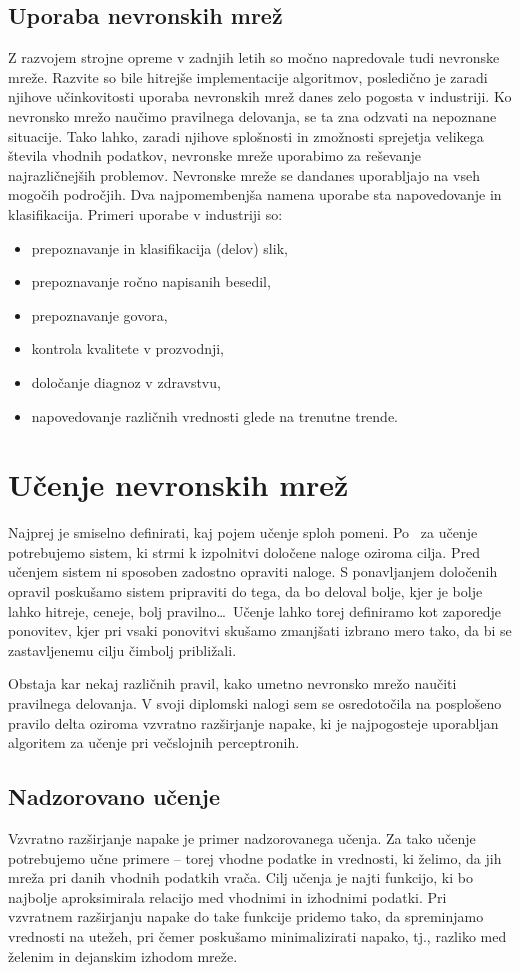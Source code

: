 \documentclass[mat1]{fmfdelo}
\begin{document}
\subsection{Uporaba nevronskih mrež}
Z razvojem strojne opreme v zadnjih letih so močno napredovale tudi nevronske mreže. Razvite so bile hitrejše implementacije algoritmov, posledično je zaradi njihove učinkovitosti uporaba nevronskih mrež danes zelo pogosta v industriji. Ko nevronsko mrežo naučimo pravilnega delovanja, se ta zna odzvati na nepoznane situacije. Tako lahko, zaradi njihove splošnosti in zmožnosti sprejetja velikega števila vhodnih podatkov, nevronske mreže uporabimo za reševanje najrazličnejših problemov. Nevronske mreže se dandanes uporabljajo na vseh mogočih področjih. Dva najpomembenjša namena uporabe sta napovedovanje in klasifikacija. Primeri uporabe v industriji so: 
\begin{itemize}
\item prepoznavanje in klasifikacija (delov) slik,
\item prepoznavanje ročno napisanih besedil,
\item prepoznavanje govora,
\item kontrola kvalitete v prozvodnji,
\item določanje diagnoz v zdravstvu,
\item napovedovanje različnih vrednosti glede na trenutne trende.
\end{itemize}
%
\section{Učenje nevronskih mrež}
Najprej je smiselno definirati, kaj pojem učenje sploh pomeni. Po~\cite[str.~37]{kononenko} za učenje potrebujemo sistem, ki strmi k izpolnitvi določene naloge oziroma cilja. Pred učenjem sistem ni sposoben zadostno opraviti naloge. S ponavljanjem določenih opravil poskušamo sistem pripraviti do tega, da bo deloval bolje, kjer je bolje lahko hitreje, ceneje, bolj pravilno\ldots\ Učenje lahko torej definiramo kot zaporedje ponovitev, kjer pri vsaki ponovitvi skušamo zmanjšati izbrano mero tako, da bi se zastavljenemu cilju čimbolj približali. 

Obstaja kar nekaj različnih pravil, kako umetno nevronsko mrežo naučiti pravilnega delovanja. V svoji diplomski nalogi sem se osredotočila na posplošeno pravilo delta oziroma vzvratno razširjanje napake, ki je najpogosteje uporabljan algoritem za učenje pri večslojnih perceptronih. 
%
\subsection{Nadzorovano učenje}
Vzvratno razširjanje napake je primer nadzorovanega učenja. Za tako učenje potrebujemo učne primere -- torej vhodne podatke in vrednosti, ki želimo, da jih mreža pri danih vhodnih podatkih vrača. Cilj učenja je najti funkcijo, ki bo najbolje aproksimirala relacijo med vhodnimi in izhodnimi podatki. Pri vzvratnem razširjanju napake do take funkcije pridemo tako, da spreminjamo vrednosti na utežeh, pri čemer poskušamo minimalizirati napako, tj., razliko med želenim in dejanskim izhodom mreže.
\end{document}
